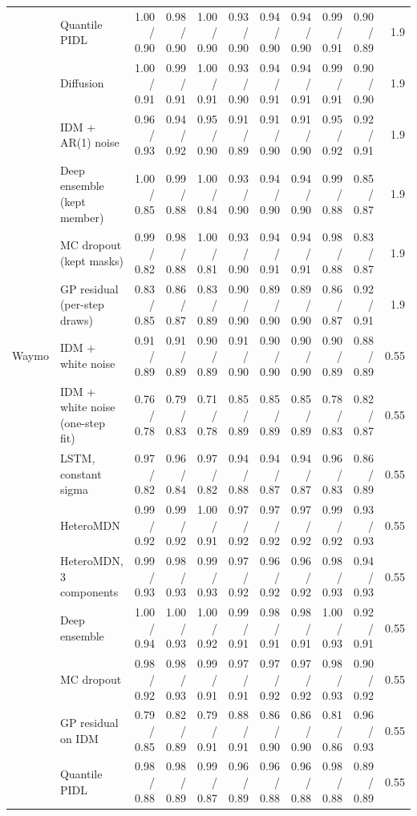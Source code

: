 \begin{longtable}{llrrrrrrrrr}
 & Quantile PIDL & 1.00 / 0.90 & 0.98 / 0.90 & 1.00 / 0.90 & 0.93 / 0.90 & 0.94 / 0.90 & 0.94 / 0.90 & 0.99 / 0.91 & 0.90 / 0.89 & 1.9 \\
 & Diffusion & 1.00 / 0.91 & 0.99 / 0.91 & 1.00 / 0.91 & 0.93 / 0.90 & 0.94 / 0.91 & 0.94 / 0.91 & 0.99 / 0.91 & 0.90 / 0.90 & 1.9 \\
 & IDM + AR(1) noise & 0.96 / 0.93 & 0.94 / 0.92 & 0.95 / 0.90 & 0.91 / 0.89 & 0.91 / 0.90 & 0.91 / 0.90 & 0.95 / 0.92 & 0.92 / 0.91 & 1.9 \\
 & Deep ensemble (kept member) & 1.00 / 0.85 & 0.99 / 0.88 & 1.00 / 0.84 & 0.93 / 0.90 & 0.94 / 0.90 & 0.94 / 0.90 & 0.99 / 0.88 & 0.85 / 0.87 & 1.9 \\
 & MC dropout (kept masks) & 0.99 / 0.82 & 0.98 / 0.88 & 1.00 / 0.81 & 0.93 / 0.90 & 0.94 / 0.91 & 0.94 / 0.91 & 0.98 / 0.88 & 0.83 / 0.87 & 1.9 \\
 & GP residual (per-step draws) & 0.83 / 0.85 & 0.86 / 0.87 & 0.83 / 0.89 & 0.90 / 0.90 & 0.89 / 0.90 & 0.89 / 0.90 & 0.86 / 0.87 & 0.92 / 0.91 & 1.9 \\
\midrule
Waymo & IDM + white noise & 0.91 / 0.89 & 0.91 / 0.89 & 0.90 / 0.89 & 0.91 / 0.90 & 0.90 / 0.90 & 0.90 / 0.90 & 0.90 / 0.89 & 0.88 / 0.89 & 0.55 \\
 & IDM + white noise (one-step fit) & 0.76 / 0.78 & 0.79 / 0.83 & 0.71 / 0.78 & 0.85 / 0.89 & 0.85 / 0.89 & 0.85 / 0.89 & 0.78 / 0.83 & 0.82 / 0.87 & 0.55 \\
 & LSTM, constant sigma & 0.97 / 0.82 & 0.96 / 0.84 & 0.97 / 0.82 & 0.94 / 0.88 & 0.94 / 0.87 & 0.94 / 0.87 & 0.96 / 0.83 & 0.86 / 0.89 & 0.55 \\
 & HeteroMDN & 0.99 / 0.92 & 0.99 / 0.92 & 1.00 / 0.91 & 0.97 / 0.92 & 0.97 / 0.92 & 0.97 / 0.92 & 0.99 / 0.92 & 0.93 / 0.93 & 0.55 \\
 & HeteroMDN, 3 components & 0.99 / 0.93 & 0.98 / 0.93 & 0.99 / 0.93 & 0.97 / 0.92 & 0.96 / 0.92 & 0.96 / 0.92 & 0.98 / 0.93 & 0.94 / 0.93 & 0.55 \\
 & Deep ensemble & 1.00 / 0.94 & 1.00 / 0.93 & 1.00 / 0.92 & 0.99 / 0.91 & 0.98 / 0.91 & 0.98 / 0.91 & 1.00 / 0.93 & 0.92 / 0.91 & 0.55 \\
 & MC dropout & 0.98 / 0.92 & 0.98 / 0.93 & 0.99 / 0.91 & 0.97 / 0.91 & 0.97 / 0.92 & 0.97 / 0.92 & 0.98 / 0.93 & 0.90 / 0.92 & 0.55 \\
 & GP residual on IDM & 0.79 / 0.85 & 0.82 / 0.89 & 0.79 / 0.91 & 0.88 / 0.91 & 0.86 / 0.90 & 0.86 / 0.90 & 0.81 / 0.86 & 0.96 / 0.93 & 0.55 \\
 & Quantile PIDL & 0.98 / 0.88 & 0.98 / 0.89 & 0.99 / 0.87 & 0.96 / 0.89 & 0.96 / 0.88 & 0.96 / 0.88 & 0.98 / 0.88 & 0.89 / 0.89 & 0.55 \\

\end{longtable}
